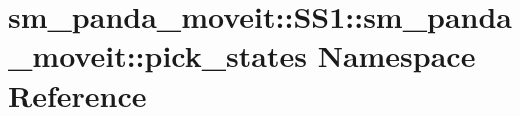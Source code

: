 \hypertarget{namespacesm__panda__moveit_1_1SS1_1_1sm__panda__moveit_1_1pick__states}{}\section{sm\+\_\+panda\+\_\+moveit\+:\+:S\+S1\+:\+:sm\+\_\+panda\+\_\+moveit\+:\+:pick\+\_\+states Namespace Reference}
\label{namespacesm__panda__moveit_1_1SS1_1_1sm__panda__moveit_1_1pick__states}
